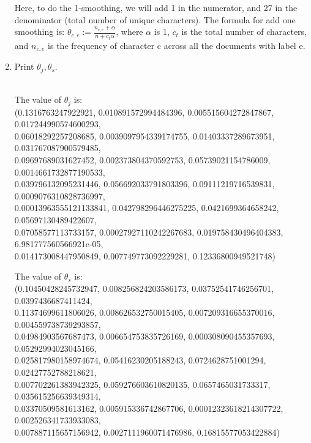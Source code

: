 \documentclass[a4paper]{article}
\theoremstyle{definition}
\newenvironment{soln}{
    \leavevmode\color{blue}\ignorespaces
}{}
\begin{document}
\begin{enumerate}
\begin{soln}
Here, to do the 1-smoothing, we will add 1 in the numerator, and 27 in the denominator (total number of unique characters). The formula for add one smoothing is:
 ${\theta_{c,e} := {\frac {n_{c,e}+ \alpha}{n + c_{t}\alpha}}}$, where $\alpha$ is 1,  $c_{t}$ is the total number of characters, and $n_{c,e}$ is the frequency of character c across all the documents with label e.
 
\end{soln}

\item
Print $\theta_j, \theta_s$.
\begin{soln}
	\\The value of $\theta_j$ is: 
	\\(0.1316763247922921, 0.010891572994484396, 0.005515604272847867, 0.017244990574600293, 
	\\0.06018292257208685, 0.0039097954339174755, 0.01403337289673951, 0.031767087900579485, 
	\\0.09697689031627452, 0.002373804370592753, 0.05739021154786009, 0.0014661732877190533, 
	\\0.039796132095231446, 0.056692033791803396, 0.09111219716539831, 0.0009076310828736997, 
	\\0.00013963555121133841, 0.042798296446275225, 0.0421699364658242, 0.05697130489422607, 
	\\0.07058577113733157, 0.00027927110242267683, 0.019758430496404383, 6.981777560566921e-05, 
	\\0.014173008447950849, 0.007749773092229281, 0.12336800949521748)
	
	The value of $\theta_s$ is:
	\\(0.10450428245732947, 0.008256824203586173, 0.03752541746256701, 0.0397436687411424, 
	\\0.11374699611806026, 0.008626532750015405, 0.007209316655370016, 0.004559738739293857, 
	\\0.04984903567687473, 0.006654753835726169, 0.000308090455357693, 0.05292994023045166, 
	\\0.025817980158974674, 0.05416230205188243, 0.0724628751001294, 0.02427752788218621, 
	\\0.007702261383942325, 0.059276603610820135, 0.0657465031733317, 0.035615256639349314, 
	\\0.03370509581613162, 0.005915336742867706, 0.00012323618214307722, 0.002526341733933083, 
	\\0.007887115657156942, 0.0027111960071476986, 0.16815577053422884)
		


\end{soln}
\end{enumerate}
\end{document}
